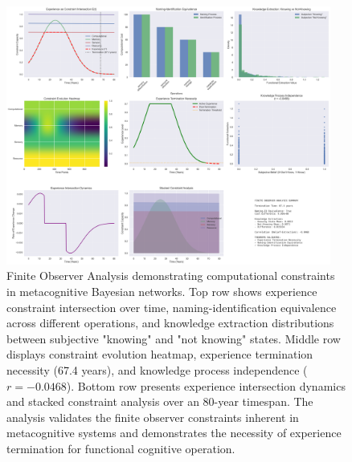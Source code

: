 \begin{figure}[htbp]
\centering
\includegraphics[width=0.95\textwidth]{images/finite_observer_analysis_20250925_190027.png}
\caption{Finite Observer Analysis demonstrating computational constraints in metacognitive Bayesian networks. Top row shows experience constraint intersection over time, naming-identification equivalence across different operations, and knowledge extraction distributions between subjective "knowing" and "not knowing" states. Middle row displays constraint evolution heatmap, experience termination necessity (67.4 years), and knowledge process independence ($r = -0.0468$). Bottom row presents experience intersection dynamics and stacked constraint analysis over an 80-year timespan. The analysis validates the finite observer constraints inherent in metacognitive systems and demonstrates the necessity of experience termination for functional cognitive operation.}
\label{fig:finite_observer}
\end{figure}

